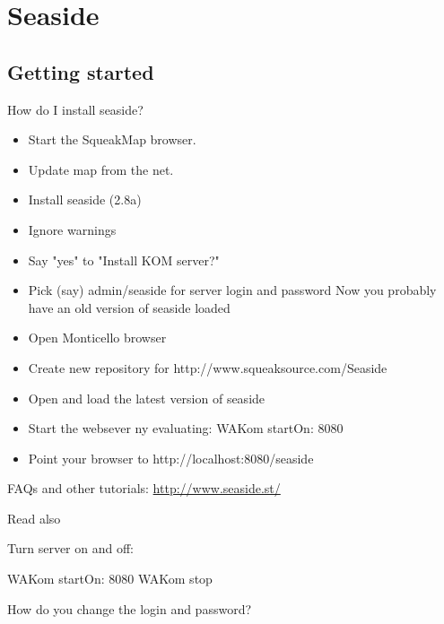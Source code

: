 \documentclass[a4paper,10pt,twoside]{book}
\begin{document}
	\sloppy
\fi
\chapter{Seaside}
\label{cha:seaside}


\section{Getting started}

\begin{faq}
How do I install seaside?
\end{faq}
\answer
\begin{itemize}
  \item 
Start the SqueakMap browser.
  \item 
Update map from the net.
  \item 
Install seaside (2.8a)
  \item 
Ignore warnings
  \item 
Say "yes" to "Install KOM server?"
  \item 
Pick (say) admin/seaside for server login and password
Now you probably have an old version of seaside loaded
  \item 
Open Monticello browser
  \item 
Create new repository for http://www.squeaksource.com/Seaside
  \item 
Open and load the latest version of seaside
  \item 
Start the websever ny evaluating:
	WAKom startOn: 8080
  \item 
Point your browser to
	http://localhost:8080/seaside
\end{itemize}

FAQs and other tutorials:
\url{http://www.seaside.st/}

Read also \cite{Duca07a}

Turn server on and off:

\begin{code}
WAKom startOn: 8080
WAKom stop
\end{code}

\begin{faq}
How do you change the login and password?
\end{faq}
\answer
\end{document}
